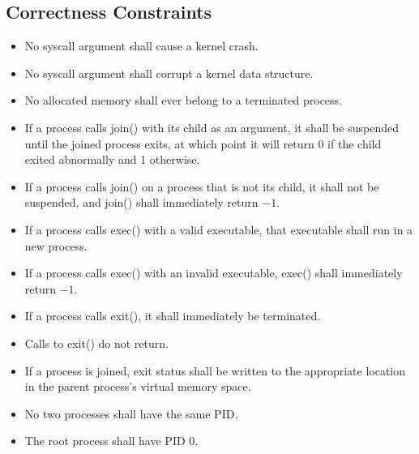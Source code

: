 \documentclass{article}
\begin{document}
\subsection{Correctness Constraints}
\begin{itemize}
\item No syscall argument shall cause a kernel crash.
\item No syscall argument shall corrupt a kernel data structure.
\item No allocated memory shall ever belong to a terminated process.
\item If a process calls {\ttfamily join()} with its child as an argument, it shall be suspended until the joined process exits, at which point it will return 0 if the child exited abnormally and 1 otherwise.
\item If a process calls {\ttfamily join()} on a process that is not its child, it shall not be suspended, and {\ttfamily join()} shall immediately return $-1$.
\item If a process calls {\ttfamily exec()} with a valid executable, that executable shall run in a new process.
\item If a process calls {\ttfamily exec()} with an invalid executable, {\ttfamily exec()} shall immediately return $-1$.
\item If a process calls {\ttfamily exit()}, it shall immediately be terminated.
\item Calls to {\ttfamily exit()} do not return.
\item If a process is joined, exit status shall be written to the appropriate location in the parent process's virtual memory space.
\item No two processes shall have the same PID.
\item The root process shall have PID 0.

\end{itemize}
\end{document}
